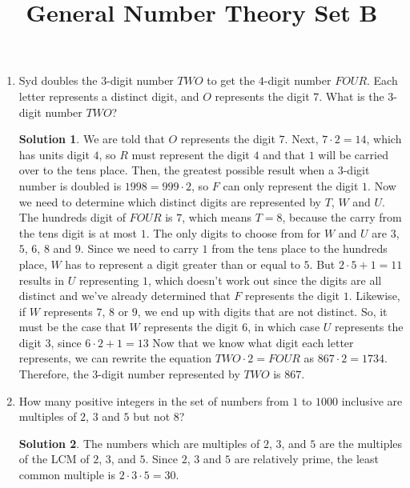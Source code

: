 \documentclass{article}
\title{General Number Theory Set B}
\date{}
\author{}
\theoremstyle{definition}
\newtheorem*{solution}{Solution}
\begin{document}
\maketitle

\begin{multicols}{2}
    \begin{enumerate}
        \item Syd doubles the $3$-digit number $TWO$ to get the $4$-digit number $FOUR$.
        Each letter represents a distinct digit, and $O$ represents the digit $7$.
        What is the $3$-digit number $TWO$?
        \begin{solution}
            We are told that $O$ represents the digit $7$.
            Next, $7 \cdot 2 = 14$, which has units digit $4$, so $R$ must represent the digit $4$ and that $1$ will be carried over to the tens place.
            Then, the greatest possible result when a $3$-digit number is doubled is $1998 = 999 \cdot 2$, so $F$ can only represent the digit $1$.
            Now we need to determine which distinct digits are represented by $T$, $W$ and $U$.
            The hundreds digit of $FOUR$ is $7$, which means $T = 8$, because the carry from the tens digit is at most $1$.
            The only digits to choose from for $W$ and $U$ are $3$, $5$, $6$, $8$ and $9$.
            Since we need to carry $1$ from the tens place to the hundreds place, $W$ has to represent a digit greater than or equal to $5$.
            But $2 \cdot 5 + 1 = 11$ results in $U$ representing $1$, which doesn't work out since the digits are all distinct and we've already determined that $F$ represents the digit $1$.
            Likewise, if $W$ represents $7$, $8$ or $9$, we end up with digits that are not distinct.
            So, it must be the case that $W$ represents the digit $6$, in which case $U$ represents the digit $3$, since $6 \cdot 2 + 1 = 13$
            Now that we know what digit each letter represents, we can rewrite the equation $TWO \cdot 2 = FOUR$ as $867 \cdot 2 = 1734$.
            Therefore, the $3$-digit number represented by $TWO$ is $\boxed{867}$.
        \end{solution}
        \item How many positive integers in the set of numbers from $1$ to $1000$ inclusive are multiples of $2$, $3$ and $5$ but not $8$?
        \begin{solution}
            The numbers which are multiples of $2$, $3$, and $5$ are the multiples of the LCM of $2$, $3$, and $5$.
            Since $2$, $3$ and $5$ are relatively prime, the least common multiple is $2 \cdot 3 \cdot 5 = 30$.

\end{solution}
\end{enumerate}
\end{multicols}
\end{document}

